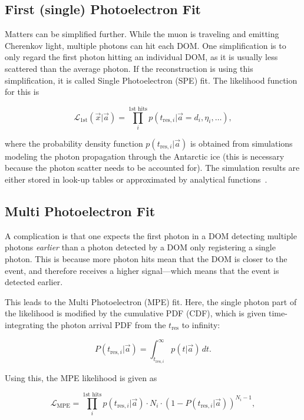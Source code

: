 \subsection{First (single) Photoelectron Fit}
Matters can be simplified further. While the muon is traveling and emitting Cherenkov light, multiple photons can hit each DOM\@. One simplification is to only regard the first photon hitting an individual DOM, as it is usually less scattered than the average photon. If the reconstruction is using this simplification, it is called Single Photoelectron (SPE) fit. The likelihood function for this is

\begin{equation}
    \mathcal{L}_\text{1st}(\vec{x}|\vec{a}) = \prod_i^\text{1st hits} p(t_{\text{res},i}|\vec{a}=d_i, \eta_i,\ldots),
\end{equation}

where the probability density function $p(t_{\text{res},i}|\vec{a})$ is obtained from simulations modeling the photon propagation through the Antarctic ice (this is necessary because the photon scatter needs to be accounted for). The simulation results are either stored in look-up tables or approximated by analytical functions~\cite{Ahrens2004}.

\subsection{Multi Photoelectron Fit}
A complication is that one expects the first photon in a DOM detecting multiple photons \textit{earlier} than a photon detected by a DOM only registering a single photon. This is because more photon hits mean that the DOM is closer to the event, and therefore receives a higher signal---which means that the event is detected earlier.

This leads to the Multi Photoelectron (MPE) fit. Here, the single photon part of the likelihood is modified by the cumulative PDF (CDF), which is given time-integrating the photon arrival PDF from the $t_\text{res}$ to infinity:

\begin{equation}
    P(t_{\text{res},i}|\vec{a}) = \int^{\infty}_{t_{\text{res},i}}p(t|\vec{a})\,dt.
\end{equation}

Using this, the MPE likelihood is given as

\begin{equation}
    \mathcal{L}_\text{MPE} = \prod_i^\text{1st hits} p(t_{\text{res},i}|\vec{a}) \cdot N_i \cdot (1-P(t_{\text{res},i}|\vec{a}))^{N_i-1},
\end{equation}


